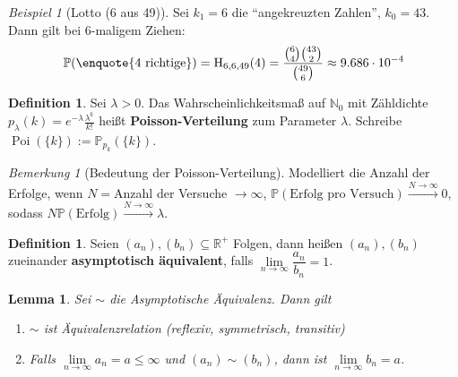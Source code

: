 \documentclass[10pt,a4paper]{article}
\newcommand{\N}{\ensuremath{\mathbb{N}}}
\newcommand{\R}{\ensuremath{\mathbb{R}}}
\newcommand{\la}{\ensuremath{\lambda}}
\newcommand{\Prb}{\mathbb P}
\newcommand{\Hypg}{\operatorname{H}}
\newcommand{\Poi}{\operatorname{Poi}}
\theoremstyle{plain}
\newtheorem{lem}[theorem]{Lemma}
\theoremstyle{definition}
\newtheorem{definition}[theorem]{Definition}
\theoremstyle{remark}
\newtheorem*{bem*}{Bemerkung}
\newtheorem{exm}[theorem]{Beispiel}
\begin{document}
	\begin{exm}[Lotto (6 aus 49)]
		Sei $k_1=6$ die \enquote{angekreuzten Zahlen}, $k_0=43$. Dann gilt bei $6$-maligem Ziehen:
		\[\Prb(\enquote{\text{4 richtige}})=\Hypg_{6,6,49}(4)=\frac{\binom{6}{4}\binom{43}{2}}{\binom{49}{6}}\approx9.686\cdot10^{-4}\]
	\end{exm}

	\begin{definition}\label{0214def}
		Sei $\la>0$. Das Wahrscheinlichkeitsmaß auf $\N_0$ mit Zähldichte $p_\la(k)=e^{-\la}\frac{\la^k}{k!}$ heißt \textbf{Poisson-Verteilung} zum Parameter $\la$. Schreibe $\Poi(\{k\}):=\Prb_{p_k}(\{k\})$.
	\end{definition}



	\begin{bem*}[Bedeutung der Poisson-Verteilung]
		Modelliert die Anzahl der Erfolge, wenn $N=$Anzahl der Versuche $\to\infty$, $\Prb(\text{Erfolg pro Versuch})\xrightarrow{N\to\infty}0$, sodass $N\Prb(\text{Erfolg})\xrightarrow{N\to\infty}\la$.
	\end{bem*}

	\begin{definition}
		Seien $(a_n),(b_n)\subseteq\R^+$ Folgen, dann heißen $(a_n),(b_n)$ zueinander \textbf{asymptotisch äquivalent}, falls $\lim\limits_{n\to\infty}\dfrac{a_n}{b_n}=1$.
	\end{definition}
	\begin{lem}
		Sei $\sim$ die Asymptotische Äquivalenz. Dann gilt
		\begin{enumerate}[label=\alph*)]
			\item $\sim$ ist Äquivalenzrelation (reflexiv, symmetrisch, transitiv)
			\item Falls $\lim\limits_{n\to\infty}a_n=a\leq \infty$ und $(a_n)\sim (b_n)$, dann ist $\lim\limits_{n\to\infty}b_n=a$.
		\end{enumerate}
	\end{lem}
	
\end{document}
